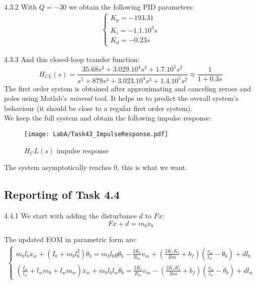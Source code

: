 \documentclass[11pt]{article}
\begin{document}
4.3.2 With $Q=-30$ we obtain the following PID parameters:
\begin{align*}
\begin{cases}
K_p=-193.31 \\
K_i=-1.1.10^3 s \\
K_d=-0.23 s
\end{cases}
\end{align*}

4.3.3 And this closed-loop transfer function:
\begin{equation*}
H_{CL}(s)=\frac{35.68s^4+3.029.10^4s^3+1.7.10^5s^2}{s^5+879s^4+3.023.10^4s^3+1.4.10^5s^2}
\approx \frac{1}{1+0.3s}
\end{equation*}
The first order system is obtained after approximating and canceling zeroes and poles using Matlab's \emph{minreal} tool. It helps us to predict the overall system's behaviour (it should be close to a regular first order system).\\
We keep the full system and obtain the following impulse response:
\begin{figure}[H]
  \texttt{[image: LabA/Task43\_ImpulseResponse.pdf]}
  \caption{$H_CL(s)$ impulse response}
  \label{fig:fig2}
\end{figure}
The system asymptotically reaches 0, this is what we want.

\subsection*{Reporting of Task 4.4}

4.4.1 We start with adding the disturbance $d$ to $Fx$:
\begin{equation*}
Fx+d=m_b \ddot x_b
\end{equation*}

The updated EOM in parametric form are: 
\begin{align*}
\begin{cases}
m_bl_b\ddot x_w + (I_b+m_b l_b^2)\ddot\theta_b =
m_bl_bg\theta_b-\frac{2K_t}{R_m}v_m+(\frac{2K_eK_t}{Rm}+b_f)(\frac{\dot x_w}{l_w}-\dot\theta_b)+d l_b\\
(\frac{I_w}{l_w}+l_wm_b+l_wm_w)\ddot x_w + m_bl_bl_w\ddot\theta_b =
\frac{2K_t}{R_m}v_m-(\frac{2K_eK_t}{Rm}+b_f)(\frac{\dot x_w}{l_w}-\dot\theta_b)+d l_w
\end{cases}
\end{align*}
													
\end{document}

